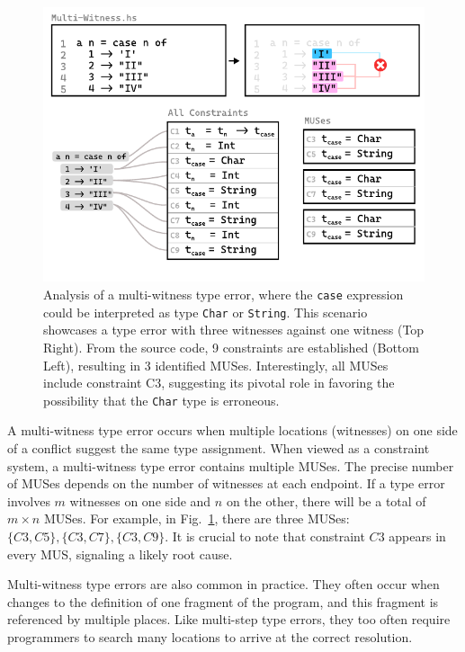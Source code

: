 \documentclass[pdflatex,lineno,sn-nature,Numbered]{sn-jnl}%
\begin{document}
\begin{figure}[hbt]
    \centering
\includegraphics[width=\linewidth]{images/Multi-Witness-MUS}
  \caption{\label{fig:multi-witness-2}
    Analysis of a multi-witness type error, where the \texttt{case} expression could be interpreted as type \texttt{Char} or \texttt{String}. This scenario showcases a type error with three witnesses against one witness (Top Right). From the source code, 9 constraints are established (Bottom Left), resulting in 3 identified MUSes. Interestingly, all MUSes include constraint C3, suggesting its pivotal role in favoring the possibility that the \texttt{Char} type is erroneous.
  }
  \end{figure}

A multi-witness type error occurs when multiple locations (witnesses) on one side of a conflict suggest the same type assignment. When viewed as a constraint system, a multi-witness type error contains multiple MUSes. The precise number of MUSes depends on the number of witnesses at each endpoint. If a type error involves $m$ witnesses on one side and $n$ on the other, there will be a total of $m \times n$ MUSes. For example, in Fig.~\ref{fig:multi-witness-2}, there are three MUSes: $\{C3, C5\}, \{C3, C7\}, \{C3, C9\}$. It is crucial to note that constraint $C3$ appears in every MUS, signaling a likely root cause.

Multi-witness type errors are also common in practice. They often occur when changes to the definition of one fragment of the program, and this fragment is referenced by multiple places. Like multi-step type errors, they too often require programmers to search many locations to arrive at the correct resolution.
\end{document}
